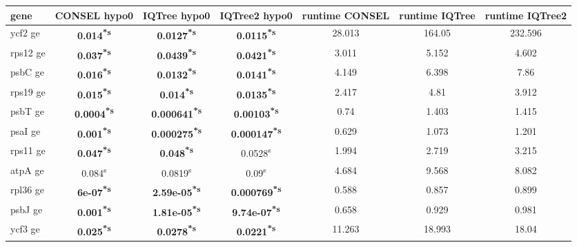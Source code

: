 \documentclass[a4paper]{article}
\begin{document}
\footnotesize
{}
\begin{longtable}{l|c|c|c|c|c|c}
gene&CONSEL hypo0&IQTree hypo0&IQTree2 hypo0&runtime CONSEL&runtime IQTree&runtime IQTree2\\
\hline
\endhead
ycf2 ge&\textbf{0.014\textsuperscript{*}\textsuperscript{s}}&\textbf{0.0127\textsuperscript{*}\textsuperscript{s}}&\textbf{0.0115\textsuperscript{*}\textsuperscript{s}}&28.013&164.05&232.596\\
rps12 ge&\textbf{0.037\textsuperscript{*}\textsuperscript{s}}&\textbf{0.0439\textsuperscript{*}\textsuperscript{s}}&\textbf{0.0421\textsuperscript{*}\textsuperscript{s}}&3.011&5.152&4.602\\
psbC ge&\textbf{0.016\textsuperscript{*}\textsuperscript{s}}&\textbf{0.0132\textsuperscript{*}\textsuperscript{s}}&\textbf{0.0141\textsuperscript{*}\textsuperscript{s}}&4.149&6.398&7.86\\
rps19 ge&\textbf{0.015\textsuperscript{*}\textsuperscript{s}}&\textbf{0.014\textsuperscript{*}\textsuperscript{s}}&\textbf{0.0135\textsuperscript{*}\textsuperscript{s}}&2.417&4.81&3.912\\
psbT ge&\textbf{0.0004\textsuperscript{*}\textsuperscript{s}}&\textbf{0.000641\textsuperscript{*}\textsuperscript{s}}&\textbf{0.00103\textsuperscript{*}\textsuperscript{s}}&0.74&1.403&1.415\\
psaI ge&\textbf{0.001\textsuperscript{*}\textsuperscript{s}}&\textbf{0.000275\textsuperscript{*}\textsuperscript{s}}&\textbf{0.000147\textsuperscript{*}\textsuperscript{s}}&0.629&1.073&1.201\\
rps11 ge&\textbf{0.047\textsuperscript{*}\textsuperscript{s}}&\textbf{0.048\textsuperscript{*}\textsuperscript{s}}&0.0528\textsuperscript{s}&1.994&2.719&3.215\\
atpA ge&0.084\textsuperscript{s}&0.0819\textsuperscript{s}&0.09\textsuperscript{s}&4.684&9.568&8.082\\
rpl36 ge&\textbf{6e-07\textsuperscript{*}\textsuperscript{s}}&\textbf{2.59e-05\textsuperscript{*}\textsuperscript{s}}&\textbf{0.000769\textsuperscript{*}\textsuperscript{s}}&0.588&0.857&0.899\\
psbJ ge&\textbf{0.001\textsuperscript{*}\textsuperscript{s}}&\textbf{1.81e-05\textsuperscript{*}\textsuperscript{s}}&\textbf{9.74e-07\textsuperscript{*}\textsuperscript{s}}&0.658&0.929&0.981\\
ycf3 ge&\textbf{0.025\textsuperscript{*}\textsuperscript{s}}&\textbf{0.0278\textsuperscript{*}\textsuperscript{s}}&\textbf{0.0221\textsuperscript{*}\textsuperscript{s}}&11.263&18.993&18.04\\

\end{longtable}
\end{document}
